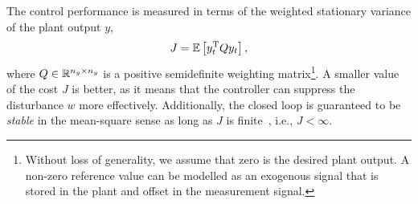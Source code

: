 The control performance is measured in terms of the weighted stationary variance of the plant output $y$,
\begin{equation}
    \label{eq:cost}
    J = \E{ y_t^{\T} Q y_t },
\end{equation}
where $Q \in \mathbb{R}^{n_y \times n_y}$ is a positive semidefinite weighting matrix\footnote{Without loss of generality, we assume that zero is the desired plant output. A non-zero reference value can be modelled as an exogenous signal that is stored in the plant and offset in the measurement signal.}.
A smaller value of the cost $J$ is better, as it means that the controller can suppress the disturbance $w$ more effectively.
Additionally, the closed loop is guaranteed to be \emph{stable} in the mean-square sense as long as $J$ is finite~\cite{Fang:2002}, i.e., $J < \infty$.

